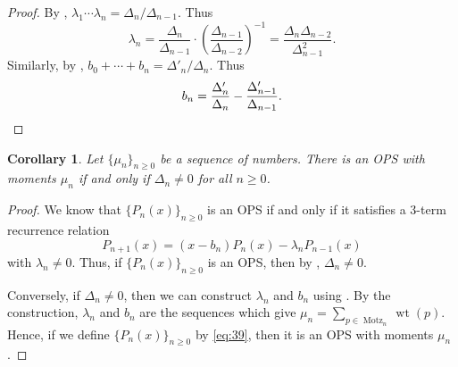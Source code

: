 \documentclass[oneside]{book}
\numberwithin{equation}{section}
\newtheorem{cor}[thm]{Corollary}
\theoremstyle{definition}
\newcommand\Motz{\operatorname{Motz}}
\newcommand\wt{\operatorname{wt}}
\begin{document}
\begin{proof}
By , \( \lambda_1 \cdots \lambda_n = \Delta_n/\Delta_{n-1} \).
Thus
\[
  \lambda_n = \frac{\Delta_n}{\Delta_{n-1}} \cdot \left(
    \frac{\Delta_{n-1}}{\Delta_{n-2}} \right)^{-1} =
  \frac{\Delta_n\Delta_{n-2}}{\Delta_{n-1}^2}.
\]
Similarly, by ,
\( b_0 + \cdots + b_n = \Delta'_n/\Delta_n \).
Thus
\[
  b_n = \frac{\Delta'_n}{\Delta_{n}} - \frac{\Delta'_{n-1}}{\Delta_{n-1}}.
  \qedhere
\]
\end{proof}

\begin{cor}\label{cor:4}
  Let \( \{ \mu_n\}_{n\ge 0} \) be a sequence of numbers. There is an
  OPS with moments \( \mu_n \) if and only if \( \Delta_n \ne 0 \) for
  all \( n \ge 0 \).
\end{cor}

\begin{proof}
  We know that \( \{ P_n(x) \}_{n\ge 0} \) is an OPS
  if and only if it satisfies a 3-term recurrence relation
  \begin{equation}\label{eq:39}
    P_{n+1}(x) = (x-b_n) P_n(x) - \lambda_n P_{n-1}(x)
  \end{equation}
  with \( \lambda_n\ne 0 \). Thus, if \( \{ P_n(x) \}_{n\ge 0} \) is
  an OPS, then by , \( \Delta_n\ne 0 \).

  Conversely, if \( \Delta_n\ne 0 \), then we can construct
  \( \lambda_n \) and \( b_n \) using . By the
  construction, \( \lambda_n \) and \( b_n \) are the sequences which
  give \( \mu_n = \sum_{p\in \Motz_n} \wt(p) \). Hence, if we define
  \( \{ P_n(x) \}_{n\ge 0} \) by \eqref{eq:39}, then it is an OPS with
  moments \( \mu_n \).
\end{proof}
\end{document}
